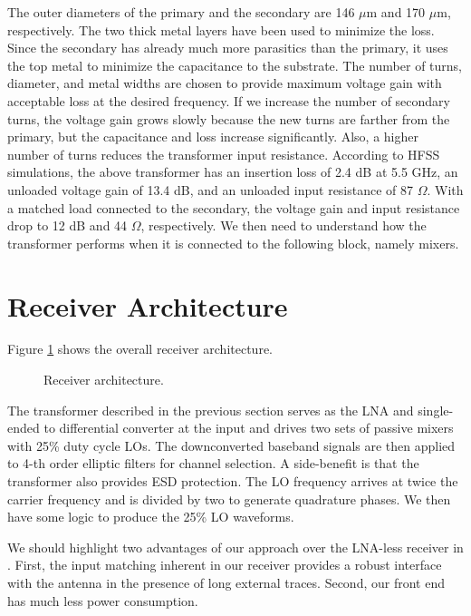 The outer diameters of the primary and the secondary are 146 $\mu$m and 170 $\mu$m, respectively. The two thick metal layers have been used to
minimize the loss. Since the secondary has already much more parasitics than the primary, it uses the top metal to minimize the capacitance to the
substrate. The number of turns, diameter, and metal widths are chosen to provide maximum voltage gain with acceptable loss at the desired
frequency. If we increase the number of secondary turns, the voltage gain grows slowly because the new turns are farther from the primary, but the
capacitance and loss increase significantly. Also, a higher number of turns reduces the transformer input resistance.  According to HFSS
simulations, the above transformer has an insertion loss of 2.4 dB at 5.5 GHz, an unloaded voltage gain of 13.4 dB, and an unloaded input resistance
of 87 $\Omega$. With a matched load connected to the secondary, the voltage gain and input resistance drop to 12 dB and 44 $\Omega$, respectively. We then
need to understand how the transformer performs when it is connected to the following block, namely mixers. 



\section{Receiver Architecture}
Figure \ref{architecture} shows the overall receiver architecture. 
\begin{figure}[htb]
\vspace{3.5in}
\caption{Receiver architecture.}
\label{architecture}
\end{figure}
The transformer described in the previous section serves as the LNA and single-ended to differential converter at the input and drives two sets of
passive mixers with 25\% duty cycle LOs. The downconverted baseband signals are then applied to 4-th order elliptic filters for channel selection. A
side-benefit is that the transformer also provides ESD protection. The LO frequency arrives at twice the carrier frequency and is divided by two to
generate quadrature phases. We then have some logic to produce the 25\% LO waveforms.

We should highlight two advantages of our approach over the LNA-less receiver in \cite{Nauta}. First, the input matching inherent in our receiver
provides a robust interface with the antenna in the presence of long external traces. Second, our front end has much less power consumption.

